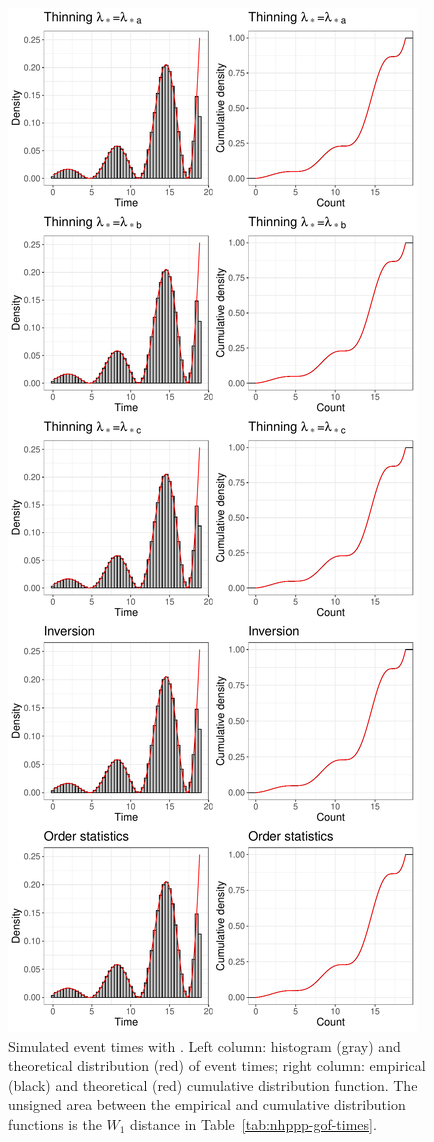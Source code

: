 \documentclass[article]{jss}\usepackage[]{graphicx}\usepackage[]{xcolor}
\makeatletter
\def\maxwidth{ %
  \ifdim\Gin@nat@width>\linewidth
    \linewidth
  \else
    \Gin@nat@width
  \fi
}
\makeatother
\begin{document}
\begin{Schunk}
\begin{figure}

{\centering \includegraphics[width=\maxwidth,height=\textheight,keepaspectratio=true]{figure/epdf-nhppp-pkg-times-1} 

}

\caption{Simulated event times with . Left column: histogram (gray) and theoretical distribution (red) of event times; right column: empirical (black) and theoretical (red) cumulative distribution function. The unsigned area between the empirical and cumulative distribution functions is the $W_1$ distance in Table~\ref{tab:nhppp-gof-times}.}\label{fig:epdf-nhppp-pkg-times}
\end{figure}
\end{Schunk}
\end{document}
